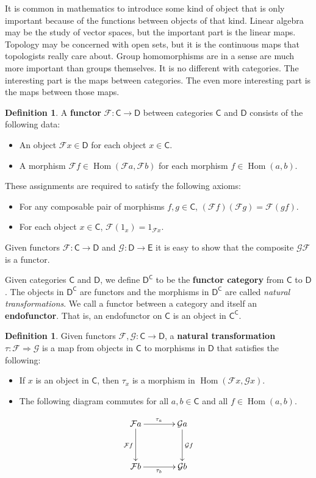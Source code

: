 \documentclass[MS, xcolor=dvipsnames]{wfuthesis}
\def\sC{\mathsf{C}}
\def\sD{\mathsf{D}}
\def\sE{\mathsf{E}}
\def\cF{\mathcal{F}}
\def\cG{\mathcal{G}}
\DeclareMathOperator{\Hom}{Hom}
\theoremstyle{definition}
\newtheorem{definition}[theorem]{Definition}
\begin{document}
It is common in mathematics to introduce some kind of object that is only important because of the functions between objects of that kind. Linear algebra may be the study of vector spaces, but the important part is the linear maps. Topology may be concerned with open sets, but it is the continuous maps that topologists really care about. Group homomorphisms are in a sense are much more important than groups themselves. It is no different with categories. The interesting part is the maps between categories. The even more interesting part is the maps between those maps.
\begin{definition}
  A \textbf{functor} $\cF: \sC \to \sD$ between categories $\sC$ and $\sD$ consists of the following data:
  \begin{itemize}
    \item An object $\cF x \in \sD$ for each object $x \in \sC$.
    \item A morphism $\cF f \in \Hom(\cF a,\cF b)$ for each morphism $f \in \Hom(a,b)$.
  \end{itemize}
  These assignments are required to satisfy the following axioms:
  \begin{itemize}
    \item For any composable pair of morphisms $f,g \in \sC$, $(\cF f) (\cF g) = \cF(gf)$.
    \item For each object $x \in \sC$, $\cF(1_x) = 1_{\cF x}$.
  \end{itemize}
  Given functors $\cF: \sC \to \sD$ and $\cG: \sD \to \sE$ it is easy to show that the composite $\cG \cF$ is a functor.
\end{definition}
Given categories $\sC$ and $\sD$, we define $\sD^\sC$ to be the \textbf{functor category} from $\sC$ to $\sD$. The objects in $\sD^\sC$ are functors and the morphisms in $\sD^\sC$ are called \emph{natural transformations}. We call a functor between a category and itself an \textbf{endofunctor}. That is, an endofunctor on $\sC$ is an object in $\sC^\sC$.
\begin{definition}
  Given functors $\cF, \cG: \sC \to \sD$, a \textbf{natural transformation} $\tau: \cF \Rightarrow \cG$ is a map from objects in $\sC$ to morphisms in $\sD$ that satisfies the following:
  \begin{itemize}
    \item If $x$ is an object in $\sC$, then $\tau_x$ is a morphism in $\Hom(\cF x, \cG x)$.
    \item The following diagram commutes for all $a,b \in \sC$ and all $f \in \Hom(a,b)$.
  \end{itemize}
  \[ \SelectTips{cm}{}\xymatrix@R+1pc@C+1pc{
      \cF a \ar[r]^{\tau_a} \ar[d]_{\cF f} & \cG a \ar[d]^{\cG f} \\ \cF b \ar[r]_{\tau_b} & \cG b
  } \]
\end{definition}
\end{document}
